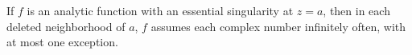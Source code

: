 If $f$ is an analytic function with an essential singularity at $z = a$, then in each deleted neighborhood of $a$, $f$ assumes each complex number infinitely often, with at most one exception.
